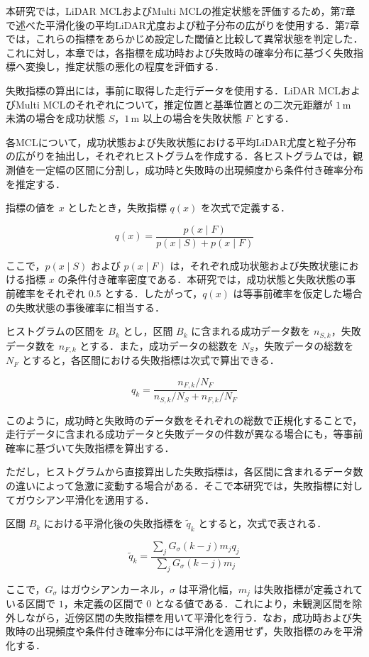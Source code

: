 本研究では，LiDAR MCLおよびMulti MCLの推定状態を評価するため，第7章で述べた平滑化後の平均LiDAR尤度および粒子分布の広がりを使用する．第7章では，これらの指標をあらかじめ設定した閾値と比較して異常状態を判定した．これに対し，本章では，各指標を成功時および失敗時の確率分布に基づく失敗指標へ変換し，推定状態の悪化の程度を評価する．

失敗指標の算出には，事前に取得した走行データを使用する．LiDAR MCLおよびMulti MCLのそれぞれについて，推定位置と基準位置との二次元距離が $1\,\mathrm{m}$ 未満の場合を成功状態 $S$，$1\,\mathrm{m}$ 以上の場合を失敗状態 $F$ とする．

各MCLについて，成功状態および失敗状態における平均LiDAR尤度と粒子分布の広がりを抽出し，それぞれヒストグラムを作成する．各ヒストグラムでは，観測値を一定幅の区間に分割し，成功時と失敗時の出現頻度から条件付き確率分布を推定する．

指標の値を $x$ としたとき，失敗指標 $q(x)$ を次式で定義する．

\[
q(x)=
\frac{p(x\mid F)}
{p(x\mid S)+p(x\mid F)}
\]

ここで，$p(x\mid S)$ および $p(x\mid F)$ は，それぞれ成功状態および失敗状態における指標 $x$ の条件付き確率密度である．本研究では，成功状態と失敗状態の事前確率をそれぞれ $0.5$ とする．したがって，$q(x)$ は等事前確率を仮定した場合の失敗状態の事後確率に相当する．

ヒストグラムの区間を $B_k$ とし，区間 $B_k$ に含まれる成功データ数を $n_{S,k}$，失敗データ数を $n_{F,k}$ とする．また，成功データの総数を $N_S$，失敗データの総数を $N_F$ とすると，各区間における失敗指標は次式で算出できる．

\[
q_k=
\frac{n_{F,k}/N_F}
{n_{S,k}/N_S+n_{F,k}/N_F}
\]

このように，成功時と失敗時のデータ数をそれぞれの総数で正規化することで，走行データに含まれる成功データと失敗データの件数が異なる場合にも，等事前確率に基づいて失敗指標を算出する．

ただし，ヒストグラムから直接算出した失敗指標は，各区間に含まれるデータ数の違いによって急激に変動する場合がある．そこで本研究では，失敗指標に対してガウシアン平滑化を適用する．

区間 $B_k$ における平滑化後の失敗指標を $\tilde{q}_k$ とすると，次式で表される．

\[
\tilde{q}_k=
\frac{
\displaystyle\sum_j G_{\sigma}(k-j)m_jq_j
}{
\displaystyle\sum_j G_{\sigma}(k-j)m_j
}
\]

ここで，$G_{\sigma}$ はガウシアンカーネル，$\sigma$ は平滑化幅，$m_j$ は失敗指標が定義されている区間で $1$，未定義の区間で $0$ となる値である．これにより，未観測区間を除外しながら，近傍区間の失敗指標を用いて平滑化を行う．なお，成功時および失敗時の出現頻度や条件付き確率分布には平滑化を適用せず，失敗指標のみを平滑化する．

